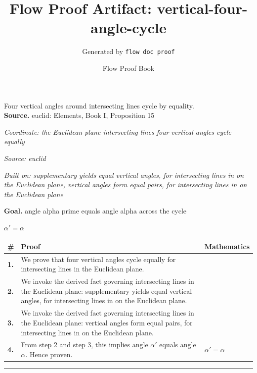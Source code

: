 \documentclass[11pt]{article}
\title{Flow Proof Artifact: vertical-four-angle-cycle}
\author{Generated by \texttt{flow doc proof}}
\date{Flow Proof Book}
\theoremstyle{definition}
\begin{document}
\maketitle
Four vertical angles around intersecting lines cycle by equality.\\[0.5em]
\textbf{Source.} euclid: Elements, Book I, Proposition 15\\[0.5em]
\bigskip
{}\par
\smallskip\noindent\textit{Coordinate: the Euclidean plane \cdot intersecting lines \cdot four vertical angles cycle equally}\par
\smallskip\noindent\textit{Source: euclid}\par
\smallskip\noindent\textit{Built on: supplementary yields equal vertical angles, for intersecting lines in on the Euclidean plane, vertical angles form equal pairs, for intersecting lines in on the Euclidean plane}\par
\medskip
\noindent\textbf{Goal.} angle alpha prime equals angle alpha across the cycle\par
\noindent$\displaystyle \alpha' = \alpha$\par
\medskip
\noindent
\begin{tabular}{@{} >{\raggedright\arraybackslash}p{} >{\raggedright\arraybackslash}p{} >{\raggedleft\arraybackslash}p{} @{}}
\textbf{\#} & \textbf{Proof} & \textbf{Mathematics} \\
\midrule
\textbf{1.} & We prove that four vertical angles cycle equally for intersecting lines in the Euclidean plane. & \\[0.45em]
\textbf{2.} & We invoke the derived fact governing intersecting lines in the Euclidean plane: supplementary yields equal vertical angles, for intersecting lines in on the Euclidean plane. & \\[0.45em]
\textbf{3.} & We invoke the derived fact governing intersecting lines in the Euclidean plane: vertical angles form equal pairs, for intersecting lines in on the Euclidean plane. & \\[0.45em]
\textbf{4.} & From step 2 and step 3, this implies angle $\alpha$$'$ equals angle $\alpha$. Hence proven. & $\displaystyle \alpha' = \alpha$ \\[0.45em]
\bottomrule
\end{tabular}
\label{thm:Geometry-intersecting lines-four_vertical_angles_cycle_equally}
\par\medskip\hrule
\end{document}
